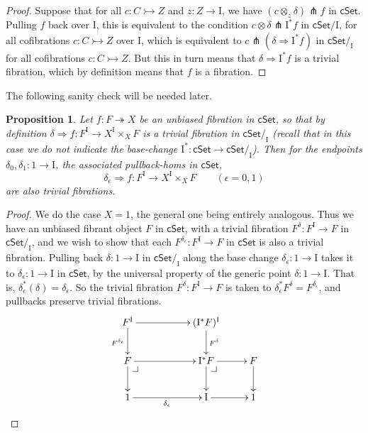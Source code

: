 \documentclass[12pt]{article}
\makeatletter
\newcommand{\cSet}{\ensuremath{\mathsf{cSet}}}
\newcommand{\mono}{\ensuremath{\rightarrowtail}}
\newcommand{\ra}{\ensuremath{\rightarrow}}
\newcommand{\fib}{\ensuremath{\twoheadrightarrow}}
\renewcommand{\to}{\ensuremath{\rightarrow}}
\newcommand{\I}{\ensuremath{\mathrm{I}}}
\newtheorem{proposition}[theorem]{Proposition}
\theoremstyle{remark}
\theoremstyle{definition}
\newcommand{\pbcorner}[1][dr]{\save*!/#1-1.2pc/#1:(-1,1)@^{|-}\restore}
\makeatother
\begin{document}
\begin{proof}
Suppose that for all $c : C\mono Z$ and $z:Z\ra\I$, we have $(c\otimes_z\delta) \pitchfork f$ in $\cSet$. Pulling $f$ back over $\I$, this is equivalent to the condition $c\otimes\delta \pitchfork \I^*f$ in $\cSet/\I$, for all cofibrations $c : C\mono Z$ over $\I$, which is equivalent to $c\pitchfork(\delta\Rightarrow \I^*f)$ in $\cSet/_\I$ for all cofibrations $c : C\mono Z$.  But this in turn means that $\delta\Rightarrow\I^*f$ is a trivial fibration, which by definition means that $f$ is a fibration.
\end{proof}

The following sanity check will be needed later.
\begin{proposition}\label{prop:sanitycheck}
Let $f:F\fib X$ be an unbiased fibration in $\cSet$, so that by definition $\delta \Rightarrow f : F^\I \to X^\I \times_X F$ is a trivial fibration in $\cSet/_\I$ (recall that in this case we do not indicate the base-change $\I^* : \cSet \to \cSet/_\I$).  Then for the endpoints $\delta_0, \delta_1 : 1 \to \I$, the associated pullback-homs in $\cSet$,
\[
\delta_\epsilon \Rightarrow f : F^\I \to X^\I \times_X F \qquad(\epsilon = 0,1)
\]
 are also trivial fibrations.
%
\end{proposition}

\begin{proof}
We do the case $X=1$, the general one being entirely analogous. Thus we have an unbiased fibrant object $F$ in $\cSet$, with a trivial fibration $F^\delta : F^\I \to F$ in $\cSet/_\I$, and we wish to show that each $F^{\delta_\epsilon} : F^\I \to F$ in $\cSet$ is also a trivial fibration.   Pulling back $\delta : 1\to \I$ in $\cSet/_\I$ along the base change $\delta_\epsilon : 1\to \I$ takes it to $\delta_\epsilon : 1\to \I$ in $\cSet$, by the universal property of the generic point $\delta : 1\to \I$.  That is, $\delta_\epsilon^*(\delta) = \delta_\epsilon$.  So the trivial fibration $F^\delta : F^\I \to F$ is taken to $\delta_\epsilon^*F^\delta = F^{\delta_\epsilon}$, and pullbacks preserve trivial fibrations. 
%
\begin{equation}\label{diagram:unbiasedfibration}
\xymatrix{
F^\I \ar[d]_{F^{\delta_\epsilon}} \ar[rr]  & & (\I^* F)^{\I} \ar[d]^{F^{\delta}} &  \\
 F \ar[d] \ar[rr] \pbcorner && \I^*F \ar[d]  \ar[r] \pbcorner & F \ar[d]  \\
 1 \ar[rr]_{\delta_\epsilon} &&  \I \ar[r] & 1 
}
\end{equation}
\end{proof}
\end{document}
